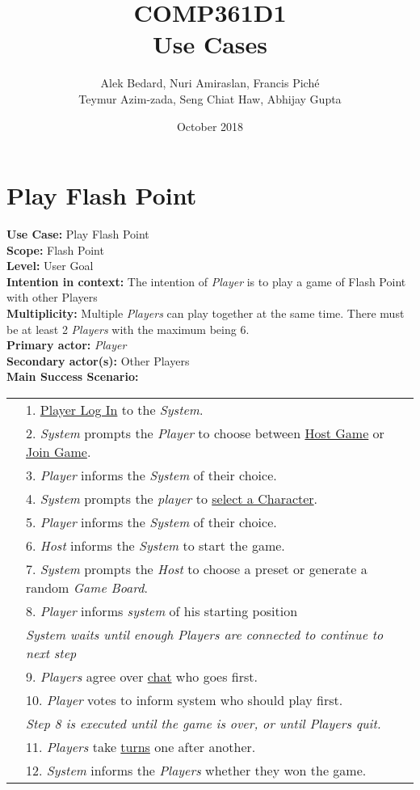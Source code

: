 \documentclass{article}
\title{COMP361D1\\Use Cases}
\author{Alek Bedard, Nuri Amiraslan, Francis Piché\\ Teymur Azim-zada, Seng Chiat Haw, Abhijay Gupta}
\date{October 2018}
\begin{document}
	\maketitle
	\section*{Play Flash Point}
	\textbf{Use Case: } Play Flash Point\\
	\textbf{Scope:} Flash Point\\
	\textbf{Level: }
	User Goal\\
	\textbf{Intention in context: }
	The intention of \textit{Player} is to play a game of Flash Point with other Players\\
	\textbf{Multiplicity: }
	Multiple \textit{Players} can play together at the same time. There must be at least 2 \textit{Players} with the maximum being 6.\\
	\textbf{Primary actor: }
	\textit{Player}\\
	\textbf{Secondary actor(s):} Other Players\\
	\textbf{Main Success Scenario:}\\
	\begin{tabular}{l l}
		&1. \underline{Player Log In} to the \textit{System}.\\
		&2. \textit{System} prompts the \textit{Player} to choose between \underline{Host Game} or \underline{Join Game}.\\
		&3. \textit{Player} informs the \textit{System} of their choice.\\
		&4. \textit{System} prompts the \textit{player} to \underline{select a Character}.\\
		&5. \textit{Player} informs the \textit{System} of their choice.\\
		&6. \textit{Host} informs the \textit{System} to start the game.\\
		&7. \textit{System} prompts the \textit{Host} to choose a preset or generate a random \textit{Game Board}.\\
		&8. \textit{Player} informs \textit{system} of his starting position\\
		&\qquad\textit{System waits until enough Players are connected to continue to next step}\\
		&9. \textit{Players} agree over \underline{chat} who goes first.\\
		&10. \textit{Player} votes to inform system who should play first.\\
		&\qquad\textit{Step 8 is executed until the game is over, or until Players quit.}\\
		&11. \textit{Players} take \underline{turns} one after another.\\
		&12. \textit{System} informs the \textit{Players} whether they won the game.
	\end{tabular}\\
\end{document}

